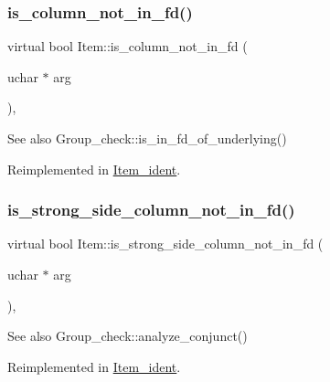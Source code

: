 \subsubsection{\texorpdfstring{is\+\_\+column\+\_\+not\+\_\+in\+\_\+fd()}{is\_column\_not\_in\_fd()}}
{\footnotesize\ttfamily virtual bool Item\+::is\+\_\+column\+\_\+not\+\_\+in\+\_\+fd (\begin{DoxyParamCaption}\item[{uchar $\ast$}]{arg }\end{DoxyParamCaption})\hspace{0.3cm}{\ttfamily [inline]}, {\ttfamily [virtual]}}

\begin{DoxySeeAlso}{See also}
Group\+\_\+check\+::is\+\_\+in\+\_\+fd\+\_\+of\+\_\+underlying() 
\end{DoxySeeAlso}


Reimplemented in \mbox{\hyperlink{classItem__ident_ab09d952b5bb33d175d548662fcdc89ef}{Item\+\_\+ident}}.

\mbox{\label{classItem_a6f6cf3b5317dce7e27b04c4eaaa37f89}} 
\subsubsection{\texorpdfstring{is\+\_\+strong\+\_\+side\+\_\+column\+\_\+not\+\_\+in\+\_\+fd()}{is\_strong\_side\_column\_not\_in\_fd()}}
{\footnotesize\ttfamily virtual bool Item\+::is\+\_\+strong\+\_\+side\+\_\+column\+\_\+not\+\_\+in\+\_\+fd (\begin{DoxyParamCaption}\item[{uchar $\ast$}]{arg }\end{DoxyParamCaption})\hspace{0.3cm}{\ttfamily [inline]}, {\ttfamily [virtual]}}

\begin{DoxySeeAlso}{See also}
Group\+\_\+check\+::analyze\+\_\+conjunct() 
\end{DoxySeeAlso}


Reimplemented in \mbox{\hyperlink{classItem__ident_a3270cc5d558904bbad4c9df6d1c28c70}{Item\+\_\+ident}}.

\mbox{\label{classItem_a7d19cd31c89cf5e660667dc27873a265}} 

